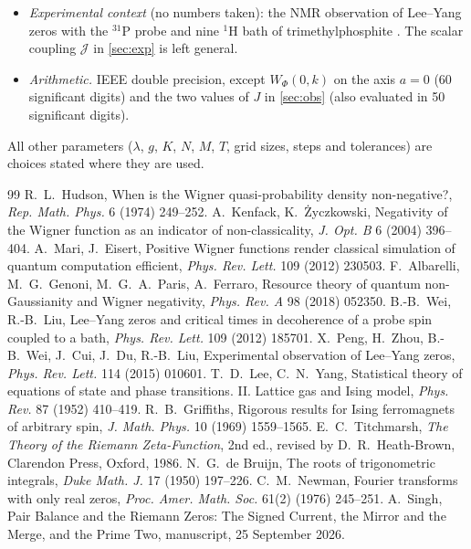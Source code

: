 \documentclass[11pt]{article}
\theoremstyle{definition}\newtheorem{definition}[theorem]{Definition}
\theoremstyle{remark}\newtheorem{remark}[theorem]{Remark}
\begin{document}
\begin{itemize}
\item \emph{Experimental context} (no numbers taken): the NMR observation of Lee--Yang zeros with the $^{31}$P probe and nine $^1$H bath of trimethylphosphite \cite{Peng}. The scalar coupling $\mathcal J$ in \cref{sec:exp} is left general.
\item \emph{Arithmetic.} IEEE double precision, except $W_\Phi(0,k)$ on the axis $a=0$ (60 significant digits) and the two values of $J$ in \cref{sec:obs} (also evaluated in 50 significant digits).
\end{itemize}
All other parameters ($\lambda$, $g$, $K$, $N$, $M$, $T$, grid sizes, steps and tolerances) are choices stated where they are used.


\begin{thebibliography}{99}\small\setlength{\itemsep}{1pt}\setlength{\parsep}{0pt}\setlength{\parskip}{0pt}
 R.~L.~Hudson, When is the Wigner quasi-probability density non-negative?, \emph{Rep. Math. Phys.} 6 (1974) 249--252.
 A.~Kenfack, K.~\.Zyczkowski, Negativity of the Wigner function as an indicator of non-classicality, \emph{J. Opt. B} 6 (2004) 396--404.
 A.~Mari, J.~Eisert, Positive Wigner functions render classical simulation of quantum computation efficient, \emph{Phys. Rev. Lett.} 109 (2012) 230503.
 F.~Albarelli, M.~G.~Genoni, M.~G.~A.~Paris, A.~Ferraro, Resource theory of quantum non-Gaussianity and Wigner negativity, \emph{Phys. Rev. A} 98 (2018) 052350.
 B.-B.~Wei, R.-B.~Liu, Lee--Yang zeros and critical times in decoherence of a probe spin coupled to a bath, \emph{Phys. Rev. Lett.} 109 (2012) 185701.
 X.~Peng, H.~Zhou, B.-B.~Wei, J.~Cui, J.~Du, R.-B.~Liu, Experimental observation of Lee--Yang zeros, \emph{Phys. Rev. Lett.} 114 (2015) 010601.
 T.~D.~Lee, C.~N.~Yang, Statistical theory of equations of state and phase transitions. II. Lattice gas and Ising model, \emph{Phys. Rev.} 87 (1952) 410--419.
 R.~B.~Griffiths, Rigorous results for Ising ferromagnets of arbitrary spin, \emph{J. Math. Phys.} 10 (1969) 1559--1565.
 E.~C.~Titchmarsh, \emph{The Theory of the Riemann Zeta-Function}, 2nd ed., revised by D.~R.~Heath-Brown, Clarendon Press, Oxford, 1986.
 N.~G.~de Bruijn, The roots of trigonometric integrals, \emph{Duke Math. J.} 17 (1950) 197--226.
 C.~M.~Newman, Fourier transforms with only real zeros, \emph{Proc. Amer. Math. Soc.} 61(2) (1976) 245--251.
 A.~Singh, Pair Balance and the Riemann Zeros: The Signed Current, the Mirror and the Merge, and the Prime Two, manuscript, 25 September 2026.

\end{thebibliography}
\end{document}

